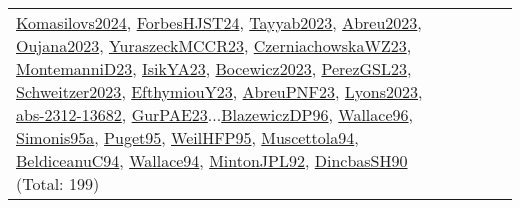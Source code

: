 {\begin{longtable}{p{3cm}r>{\raggedright\arraybackslash}p{6cm}>{\raggedright\arraybackslash}p{6cm}>{\raggedright\arraybackslash}p{8cm}}
\hyperref[detail:Komasilovs2024]{Komasilovs2024}, \hyperref[detail:ForbesHJST24]{ForbesHJST24}, \hyperref[detail:Tayyab2023]{Tayyab2023}, \hyperref[detail:Abreu2023]{Abreu2023}, \hyperref[detail:Oujana2023]{Oujana2023}, \hyperref[detail:YuraszeckMCCR23]{YuraszeckMCCR23}, \hyperref[detail:CzerniachowskaWZ23]{CzerniachowskaWZ23}, \hyperref[detail:MontemanniD23]{MontemanniD23}, \hyperref[detail:IsikYA23]{IsikYA23}, \hyperref[detail:Bocewicz2023]{Bocewicz2023}, \hyperref[detail:PerezGSL23]{PerezGSL23}, \hyperref[detail:Schweitzer2023]{Schweitzer2023}, \hyperref[detail:EfthymiouY23]{EfthymiouY23}, \hyperref[detail:AbreuPNF23]{AbreuPNF23}, \hyperref[detail:Lyons2023]{Lyons2023}, \hyperref[detail:abs-2312-13682]{abs-2312-13682}, \hyperref[detail:GurPAE23]{GurPAE23}...\hyperref[detail:BlazewiczDP96]{BlazewiczDP96}, \hyperref[detail:Wallace96]{Wallace96}, \hyperref[detail:Simonis95a]{Simonis95a}, \hyperref[detail:Puget95]{Puget95}, \hyperref[detail:WeilHFP95]{WeilHFP95}, \hyperref[detail:Muscettola94]{Muscettola94}, \hyperref[detail:BeldiceanuC94]{BeldiceanuC94}, \hyperref[detail:Wallace94]{Wallace94}, \hyperref[detail:MintonJPL92]{MintonJPL92}, \hyperref[detail:DincbasSH90]{DincbasSH90} (Total: 199)\\

\end{longtable}}
